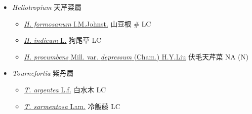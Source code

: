 
  \begin{itemize}
 \item[] \textit{Heliotropium} 天芹菜屬
                                
  \begin{itemize}
        \item[] \href{http://www.theplantlist.org/tpl1.1/search?q=Heliotropium+formosanum}{\textit{H. formosanum} I.M.Johnst.}   山豆根  \# LC
        \item[] \href{http://www.theplantlist.org/tpl1.1/search?q=Heliotropium+indicum}{\textit{H. indicum} L.}   狗尾草   LC
        \item[] \href{http://www.theplantlist.org/tpl1.1/search?q=Heliotropium+procumbens+var.+depressum}{\textit{H. procumbens} Mill. var. \textit{depressum} (Cham.) H.Y.Liu}   伏毛天芹菜   NA (N)
  \end{itemize}
 \item[] \textit{Tournefortia} 紫丹屬
                                
  \begin{itemize}
        \item[] \href{http://www.theplantlist.org/tpl1.1/search?q=Tournefortia+argentea}{\textit{T. argentea} L.f.}   白水木   LC
        \item[] \href{http://www.theplantlist.org/tpl1.1/search?q=Tournefortia+sarmentosa}{\textit{T. sarmentosa} Lam.}   冷飯藤   LC
  \end{itemize}
  \end{itemize}
